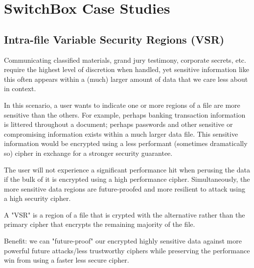 \section{SwitchBox Case Studies} \label{sec:usecases}


\subsection{Intra-file Variable Security Regions (VSR)}

Communicating classified materials, grand jury testimony, corporate secrets,
etc. require the highest level of discretion when handled, yet sensitive
information like this often appears within a (much) larger amount of data that
we care less about in context.

In this scenario, a user wants to indicate one or more regions of a file are
more sensitive than the others. For example, perhaps banking transaction
information is littered throughout a document; perhaps passwords and other
sensitive or compromising information exists within a much larger data file.
This sensitive information would be encrypted using a less performant (sometimes
dramatically so) cipher in exchange for a stronger security guarantee.

The user will not experience a significant performance hit when perusing the
data if the bulk of it is encrypted using a high performance cipher.
Simultaneously, the more sensitive data regions are future-proofed and more
resilient to attack using a high security cipher.

A "VSR" is a region of a file that is crypted with the alternative
rather than the primary cipher that encrypts the remaining majority of the file.

Benefit: we can "future-proof" our encrypted highly sensitive data against more
powerful future attacks/less trustworthy ciphers while preserving the
performance win from using a faster less secure cipher.


